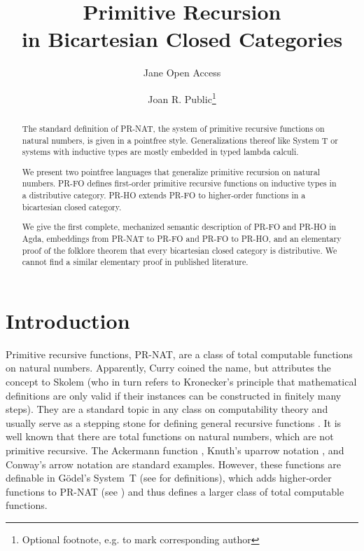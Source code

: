 \documentclass[a4paper,USenglish,cleveref, autoref, thm-restate]{lipics-v2021}
\title{Primitive Recursion \\ in Bicartesian Closed Categories} %
\author{Jane {Open Access}}{Dummy University Computing Laboratory, [optional: Address], Country \and My second affiliation, Country \and \url{http://www.myhomepage.edu} }{johnqpublic@dummyuni.org}{https://orcid.org/0000-0002-1825-0097}{}%
\author{Joan R. Public\footnote{Optional footnote, e.g. to mark corresponding author}}{Department of Informatics, Dummy College, [optional: Address], Country}{joanrpublic@dummycollege.org}{[orcid]}{}
\begin{document}
\newcommand\Nat{\ensuremath{\mathbb{N}}}
\newcommand{\many}[2]{{#1}_0,\dots,{#1}_{#2-1}}
\newcommand{\xs}{\many{x}}
\newcommand{\xn}{\xs{n}}

\maketitle

\begin{abstract}
  The standard definition of PR-NAT, the system of primitive recursive functions on natural
  numbers, is given in a pointfree style. Generalizations thereof like
  System T or systems with inductive types are mostly embedded in
  typed lambda calculi.

  We present two pointfree languages that generalize primitive
  recursion on natural numbers. PR-FO defines
  first-order primitive recursive functions on inductive types in a
  distributive
  category. PR-HO extends PR-FO to higher-order functions in a
  bicartesian closed category.

  We give the first complete, mechanized semantic description of
  PR-FO and PR-HO in Agda, embeddings from PR-NAT to PR-FO and
  PR-FO to PR-HO, and an elementary proof of the folklore theorem
  that every bicartesian closed category is distributive. We cannot
  find a similar elementary proof in published literature.
\end{abstract}

\section{Introduction}
\label{sec:introduction}

Primitive recursive functions, PR-NAT, are a class of total computable
functions on natural numbers. Apparently, Curry
\cite{curry41:_formal_recur_arith} coined the name, but attributes the
concept to Skolem \cite{skolem23} (who in turn refers to Kronecker's
principle that mathematical definitions are only valid if their
instances can be constructed in finitely many steps).
They are a standard topic in any class on computability theory and
usually serve as a stepping stone for defining general recursive functions
\cite{kleene36:_gener_recur_funct_natur_number}.
It is well known that there are total functions on natural
numbers, which are not primitive recursive. The
Ackermann function \cite{szasz1991machine}, Knuth's uparrow
notation \cite{knuth76:_mathem_comput_scien}, and Conway's arrow
notation \cite{conway96:_book_number} are standard examples. However,
these functions are definable in G\"odel's System~T \cite{goedel58} (see
\cite{DBLP:journals/corr/Widemann16} for definitions), which adds higher-order functions to PR-NAT (see
\cite[Chapter 9]{DBLP:books/cu/Ha2016}) and thus defines a larger
class of total computable functions.
\end{document}
